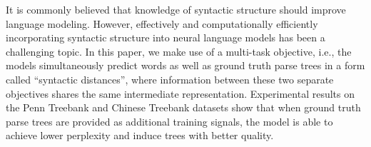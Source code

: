 It is commonly believed that knowledge of syntactic structure should improve language modeling. However, effectively and computationally efficiently incorporating syntactic structure into neural language models has been a challenging topic. In this paper, we make use of a multi-task objective, i.e., the models simultaneously predict words as well as ground truth parse trees in a form called ``syntactic distances'', where information between these two separate objectives shares the same intermediate representation. Experimental results on the Penn Treebank and Chinese Treebank datasets show that when ground truth parse trees are provided as additional training signals, the model is able to achieve lower perplexity and induce trees with better quality.
